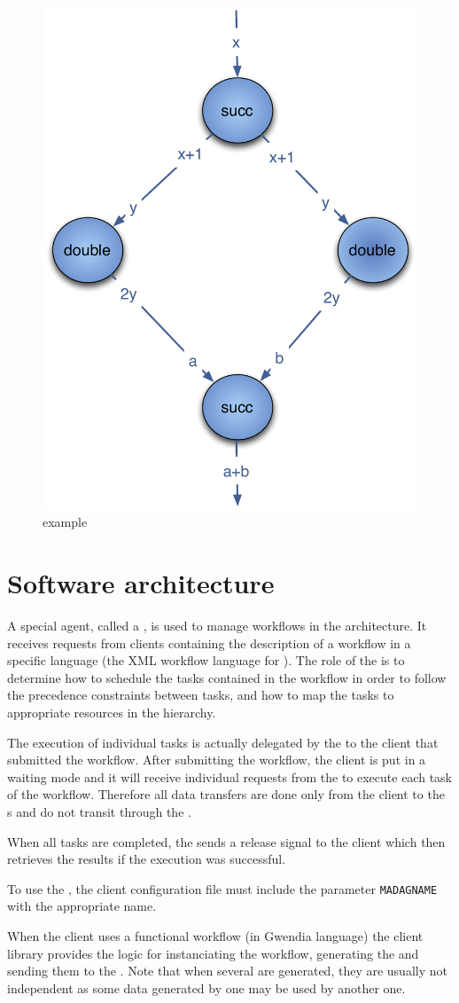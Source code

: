 \begin{figure}[htbp]
  \centering
  \includegraphics[keepaspectratio,width=0.4\linewidth]{fig/wf_example1}
  \caption{\DAG example}
  \label{fig:example1}
\end{figure}

\section{Software architecture}

A special agent, called a \textit{\madag}, is used to manage workflows in the
\diet architecture. It receives requests from clients containing the
description of a workflow in a specific language (the \madag XML workflow
language for \DAGS). The role of the \madag is to determine how to schedule the
tasks contained in the workflow in order to follow the precedence constraints
between tasks, and how to map the tasks to appropriate resources in the \diet
hierarchy.

The execution of individual tasks is actually delegated by the \madag to
the client that submitted the workflow. After submitting the workflow, the
client is put in a waiting mode and it will receive individual requests from
the \madag to execute each task of the workflow. Therefore all data
transfers are done only from the client to the {\sed}s and do not transit
through the \madag.

When all tasks are completed, the \madag sends a release signal to the
client which then retrieves the results if the execution was successful.

To use the \madag, the client configuration file must include the parameter
\texttt{MADAGNAME} with the appropriate name.

When the client uses a functional workflow (in Gwendia language) the \diet
client library provides the logic for instanciating the workflow, generating
the \DAGS and sending them to the \madag. Note that when several \DAGS are
generated, they are usually not independent as some data generated by one \DAG
may be used by another one.

